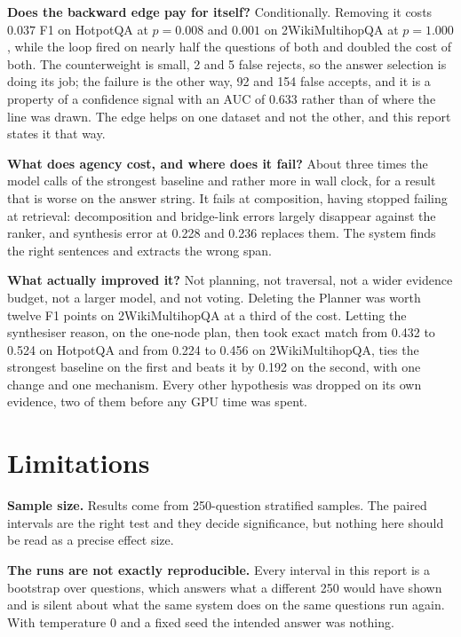 \textbf{Does the backward edge pay for itself?} Conditionally. Removing it
costs $0.037$ F1 on HotpotQA at $p = 0.008$ and $0.001$ on 2WikiMultihopQA at
$p = 1.000$, while the loop fired on nearly half the questions of both and
doubled the cost of both. The counterweight is small, 2 and 5 false rejects,
so the answer selection is doing its job; the failure is the other way, 92 and
154 false accepts, and it is a property of a confidence signal with an AUC of
0.633 rather than of where the line was drawn. The edge helps on one dataset
and not the other, and this report states it that way.

\textbf{What does agency cost, and where does it fail?} About three times the
model calls of the strongest baseline and rather more in wall clock, for a
result that is worse on the answer string. It fails at composition, having
stopped failing at retrieval: decomposition and bridge-link errors largely
disappear against the ranker, and synthesis error at 0.228 and 0.236 replaces
them. The system finds the right sentences and extracts the wrong span.

\textbf{What actually improved it?} Not planning, not traversal, not a wider
evidence budget, not a larger model, and not voting. Deleting the Planner was
worth twelve F1 points on 2WikiMultihopQA at a third of the cost. Letting the
synthesiser reason, on the one-node plan, then took exact match from 0.432 to
0.524 on HotpotQA and from 0.224 to 0.456 on 2WikiMultihopQA, ties the
strongest baseline on the first and beats it by 0.192 on the second, with one
change and one mechanism. Every other hypothesis was dropped on its own
evidence, two of them before any GPU time was spent.

\section{Limitations}

\textbf{Sample size.} Results come from 250-question stratified samples. The
paired intervals are the right test and they decide significance, but nothing
here should be read as a precise effect size.

\textbf{The runs are not exactly reproducible.} Every interval in this report
is a bootstrap over questions, which answers what a different 250 would have
shown and is silent about what the same system does on the same questions run
again. With temperature 0 and a fixed seed the intended answer was nothing.



